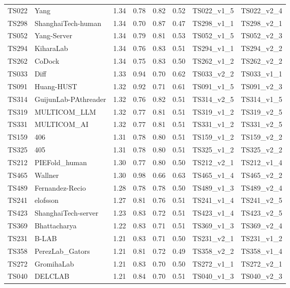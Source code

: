 \begin{table}[ht]
{\begin{tabular}{llllllll}
TS022 & Yang & 1.34 & 0.78 & 0.82 & 0.52 & TS022\_v1\_5 & TS022\_v2\_4 \\ 
TS298 & ShanghaiTech-human & 1.34 & 0.70 & 0.87 & 0.47 & TS298\_v1\_1 & TS298\_v2\_1 \\ 
TS052 & Yang-Server & 1.34 & 0.79 & 0.81 & 0.53 & TS052\_v1\_5 & TS052\_v2\_3 \\ 
TS294 & KiharaLab & 1.34 & 0.76 & 0.83 & 0.51 & TS294\_v1\_1 & TS294\_v2\_2 \\ 
TS262 & CoDock & 1.34 & 0.75 & 0.83 & 0.50 & TS262\_v1\_2 & TS262\_v2\_2 \\ 
TS033 & Diff & 1.33 & 0.94 & 0.70 & 0.62 & TS033\_v2\_2 & TS033\_v1\_1 \\ 
TS091 & Huang-HUST & 1.32 & 0.92 & 0.71 & 0.61 & TS091\_v1\_5 & TS091\_v2\_3 \\ 
TS314 & GuijunLab-PAthreader & 1.32 & 0.76 & 0.82 & 0.51 & TS314\_v2\_5 & TS314\_v1\_5 \\ 
TS319 & MULTICOM\_LLM & 1.32 & 0.77 & 0.81 & 0.51 & TS319\_v1\_2 & TS319\_v2\_5 \\ 
TS331 & MULTICOM\_AI & 1.32 & 0.77 & 0.81 & 0.51 & TS331\_v1\_2 & TS331\_v2\_5 \\ 
TS159 & 406 & 1.31 & 0.78 & 0.80 & 0.51 & TS159\_v1\_2 & TS159\_v2\_2 \\ 
TS325 & 405 & 1.31 & 0.78 & 0.80 & 0.51 & TS325\_v1\_2 & TS325\_v2\_2 \\ 
TS212 & PIEFold\_human & 1.30 & 0.77 & 0.80 & 0.50 & TS212\_v2\_1 & TS212\_v1\_4 \\ 
TS465 & Wallner & 1.30 & 0.98 & 0.66 & 0.63 & TS465\_v1\_4 & TS465\_v2\_2 \\ 
TS489 & Fernandez-Recio & 1.28 & 0.78 & 0.78 & 0.50 & TS489\_v1\_3 & TS489\_v2\_4 \\ 
TS241 & elofsson & 1.27 & 0.81 & 0.76 & 0.51 & TS241\_v1\_4 & TS241\_v2\_5 \\ 
TS423 & ShanghaiTech-server & 1.23 & 0.83 & 0.72 & 0.51 & TS423\_v1\_4 & TS423\_v2\_5 \\ 
TS369 & Bhattacharya & 1.22 & 0.83 & 0.71 & 0.51 & TS369\_v1\_3 & TS369\_v2\_4 \\ 
TS231 & B-LAB & 1.21 & 0.83 & 0.71 & 0.50 & TS231\_v2\_1 & TS231\_v1\_2 \\ 
TS358 & PerezLab\_Gators & 1.21 & 0.81 & 0.72 & 0.49 & TS358\_v2\_2 & TS358\_v1\_4 \\ 
TS272 & GromihaLab & 1.21 & 0.83 & 0.70 & 0.50 & TS272\_v1\_1 & TS272\_v2\_1 \\ 
TS040 & DELCLAB & 1.21 & 0.84 & 0.70 & 0.51 & TS040\_v1\_3 & TS040\_v2\_3 \\ 

\end{tabular}}
\end{table}
